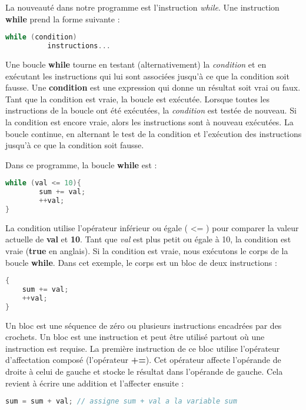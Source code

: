 La nouveauté dans notre programme est l'instruction \textit{while}. Une instruction \textbf{while} prend la forme suivante :

\medbreak
\begin{lstlisting}[language=C++]
	while (condition)
          instructions...
\end{lstlisting}
\medbreak

Une boucle \textbf{while} tourne en testant (alternativement) la \textit{condition} et en exécutant les instructions qui lui sont associées jusqu'à ce que la condition soit fausse. Une \textbf{condition} est une expression qui donne un résultat soit vrai ou faux. Tant que la condition est vraie, la boucle est exécutée. Lorsque toutes les instructions de la boucle ont été exécutées, la \textit{condition} est testée de nouveau. Si la condition est encore vraie, alors les instructions sont à nouveau exécutées. La boucle continue, en alternant le test de la condition et l'exécution des instructions jusqu'à ce que la condition soit fausse.

Dans ce programme, la boucle \textbf{while} est :

\medbreak
\begin{lstlisting}[language=C++]
	while (val <= 10){
		sum += val;
		++val;	
}
\end{lstlisting}
\medbreak

La condition utilise l'opérateur inférieur ou égale ( <= ) pour comparer la valeur actuelle de \textbf{val} et \textbf{10}. Tant que \textit{val} est plus petit ou égale à 10, la condition est vraie (\textbf{true} en anglais). Si la condition est vraie, nous exécutons le corps de la boucle \textbf{while}. Dans cet exemple, le corps est un bloc de deux instructions :

\medbreak
\begin{lstlisting}[language=C++]
{
    sum += val;
    ++val;	
}
\end{lstlisting}
\medbreak

Un bloc est une séquence de zéro ou plusieurs instructions encadrées par des crochets. Un bloc est une instruction et peut être utilisé partout où une instruction est requise. La première instruction de ce bloc utilise l'opérateur d'affectation composé (l'opérateur \textbf{+=}). Cet opérateur affecte l'opérande de droite à celui de gauche et stocke le résultat dans l'opérande de gauche. Cela revient à écrire une addition et l'affecter ensuite :

\medbreak
\begin{lstlisting}[language=C++]
	sum = sum + val; // assigne sum + val a la variable sum
\end{lstlisting}
\medbreak

